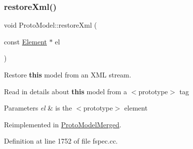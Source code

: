 \subsubsection{\texorpdfstring{restoreXml()}{restoreXml()}}
{\footnotesize\ttfamily void Proto\+Model\+::restore\+Xml (\begin{DoxyParamCaption}\item[{const \mbox{\hyperlink{class_element}{Element}} $\ast$}]{el }\end{DoxyParamCaption})\hspace{0.3cm}{\ttfamily [virtual]}}



Restore {\bfseries{this}} model from an X\+ML stream. 

Read in details about {\bfseries{this}} model from a $<$prototype$>$ tag 
\begin{DoxyParams}{Parameters}
{\em el} & is the $<$prototype$>$ element \\
\hline
\end{DoxyParams}


Reimplemented in \mbox{\hyperlink{class_proto_model_merged_a1c80c617c086b0edacb483f8315d12e9}{Proto\+Model\+Merged}}.



Definition at line 1752 of file fspec.\+cc.

